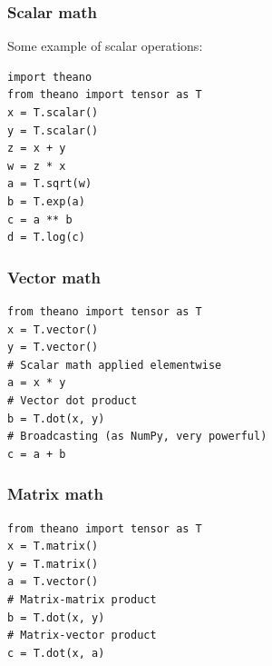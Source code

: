 \documentclass[utf8x,xcolor=pdftex,dvipsnames,table]{beamer}
\begin{document}


\begin{frame}[fragile]
  \frametitle{Scalar math}
Some example of scalar operations:
\begin{lstlisting}
import theano
from theano import tensor as T
x = T.scalar()
y = T.scalar()
z = x + y
w = z * x
a = T.sqrt(w)
b = T.exp(a)
c = a ** b
d = T.log(c)
\end{lstlisting}
\end{frame}

\begin{frame}[fragile]
  \frametitle{Vector math}

\begin{lstlisting}
from theano import tensor as T
x = T.vector()
y = T.vector()
# Scalar math applied elementwise
a = x * y
# Vector dot product
b = T.dot(x, y)
# Broadcasting (as NumPy, very powerful)
c = a + b
\end{lstlisting}
\end{frame}

\begin{frame}[fragile]
  \frametitle{Matrix math}

\begin{lstlisting}
from theano import tensor as T
x = T.matrix()
y = T.matrix()
a = T.vector()
# Matrix-matrix product
b = T.dot(x, y)
# Matrix-vector product
c = T.dot(x, a)
\end{lstlisting}
\end{frame}
\end{document}
